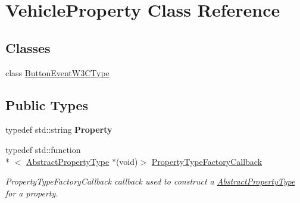\hypertarget{classVehicleProperty}{\section{Vehicle\+Property Class Reference}
\label{classVehicleProperty}
}
\subsection*{Classes}
\begin{DoxyCompactItemize}
\item 
class \hyperlink{classVehicleProperty_1_1ButtonEventW3CType}{Button\+Event\+W3\+C\+Type}
\end{DoxyCompactItemize}
\subsection*{Public Types}
\begin{DoxyCompactItemize}
\item 
\hypertarget{classVehicleProperty_acf303d050168f571e838813f3e6042d1}{typedef std\+::string {\bfseries Property}}\label{classVehicleProperty_acf303d050168f571e838813f3e6042d1}

\item 
typedef std\+::function\\*
$<$ \hyperlink{classAbstractPropertyType}{Abstract\+Property\+Type} $\ast$(void)$>$ \hyperlink{classVehicleProperty_a6fdd075ce5b867b571020fcdc723ddcf}{Property\+Type\+Factory\+Callback}
\begin{DoxyCompactList}\small\item\em Property\+Type\+Factory\+Callback callback used to construct a \hyperlink{classAbstractPropertyType}{Abstract\+Property\+Type} for a property. \end{DoxyCompactList}\end{DoxyCompactItemize}
